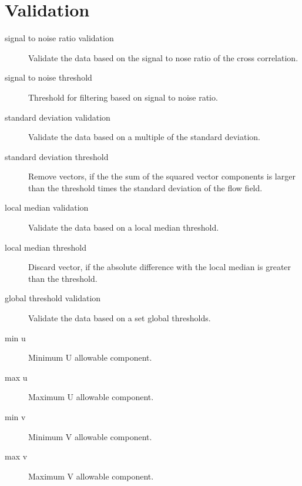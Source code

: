 \documentclass[letterpaper,10pt,english]{sphinxmanual}
\begin{document}
\section{Validation}
\label{\detokenize{parameters:validation}}\begin{description}
\item[{signal to noise ratio validation}] \leavevmode
Validate the data based on the signal to nose ratio of the cross correlation.

\item[{signal to noise threshold}] \leavevmode
Threshold for filtering based on signal to noise ratio.

\item[{standard deviation validation}] \leavevmode
Validate the data based on a multiple of the standard deviation.

\item[{standard deviation threshold}] \leavevmode
Remove vectors, if the the sum of the squared vector components is larger than the threshold times the standard deviation of the flow field.

\item[{local median validation}] \leavevmode
Validate the data based on a local median threshold.

\item[{local median threshold}] \leavevmode
Discard vector, if the absolute difference with the local median is greater than the threshold.

\item[{global threshold validation}] \leavevmode
Validate the data based on a set global thresholds.

\item[{min u}] \leavevmode
Minimum U allowable component.

\item[{max u}] \leavevmode
Maximum U allowable component.

\item[{min v}] \leavevmode
Minimum V allowable component.

\item[{max v}] \leavevmode
Maximum V allowable component.

\end{description}
\end{document}
